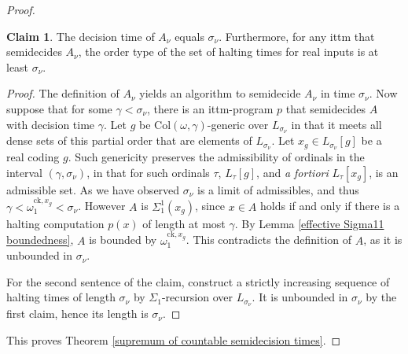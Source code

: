 \documentclass[a4paper,11pt]{amsart}
\theoremstyle{definition}
\newcommand{\ck}{\mathrm{ck}}
\renewcommand{\Col}{\mathrm{Col}}
\newtheorem*{problem A}{Problem 1}
\newtheorem*{problem B}{Problem 2}
\newtheorem*{claim*}{Claim}
\theoremstyle{remark}
\begin{document}
\begin{proof}
\begin{claim*} 
\label{lower bound for decision time} 
The decision time of $A_\nu$ equals $\sigma_\nu$. 
Furthermore, for any ittm that semidecides $A_\nu$, the order type of the set of halting times for real inputs is at least $\sigma_\nu$. 
\end{claim*} 
\begin{proof} 
The definition of $A_\nu$ yields an algorithm to semidecide $A_\nu$ in time $\sigma_\nu$. 
Now suppose that for some $\gamma<\sigma_\nu$, there is an ittm-program $p$ that semidecides $A$ with decision time $\gamma$. 
Let $g$ be $\Col(\omega,\gamma)$-generic over $L_{\sigma_\nu}$ in that it meets all dense sets of this partial order that are elements of $L_{\sigma_{\nu}}$.  Let $x_g\in L_{\sigma_\nu}[g]$ be a real coding $g$. 
 Such genericity preserves the admissibility of ordinals in the interval $(\gamma,\sigma_{\nu})$, in that for such ordinals $\tau$, $L_{\tau}[g]$, and {\em a fortiori} $L_{\tau}[x_{g}]$, is an admissible set. As we have observed $\sigma_{\nu}$ is a limit of admissibles, and thus $\gamma < \omega_1^{\ck,x_{g}}<\sigma_\nu$.  However $A$ is $\Sigma^1_1(x_g)$, since $x\in A$ holds if and only if there is a halting computation $p(x)$ of length at most $\gamma$. 
By Lemma \ref{effective Sigma11 boundedness}, $A$ is bounded by $\omega_1^{\ck,x_g}$. 
This contradicts the definition of $A$, as it is unbounded in $\sigma_\nu$. 

For the second sentence of the claim, construct a strictly increasing sequence of halting times of length $\sigma_\nu$ by $\Sigma_1$-recursion over $L_{\sigma_\nu}$. 
It is unbounded in $\sigma_\nu$ by the first claim, hence its length is $\sigma_\nu$. 
\end{proof} 
This proves Theorem \ref{supremum of countable semidecision times}. 
\end{proof} 
\end{document}

